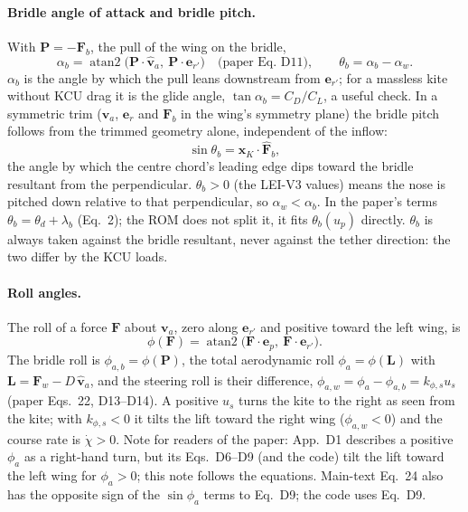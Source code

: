 \documentclass[11pt,a4paper]{article}
\begin{document}
\paragraph{Bridle angle of attack and bridle pitch.} With
$\mathbf P=-\mathbf F_b$, the pull of the wing on the bridle,
\begin{equation}
  \alpha_b=\operatorname{atan2}\bigl(\mathbf P\cdot\hat{\mathbf v}_a,\ \mathbf P\cdot\mathbf e_{r'}\bigr)
  \quad\text{(paper Eq.~D11)},\qquad
  \theta_b=\alpha_b-\alpha_w .
  \label{eq:alpha-b}
\end{equation}
$\alpha_b$ is the angle by which the pull leans downstream from
$\mathbf e_{r'}$; for a massless kite without KCU drag it is the glide angle,
$\tan\alpha_b=C_D/C_L$, a useful check. In a symmetric trim ($\mathbf v_a$,
$\mathbf e_r$ and $\mathbf F_b$ in the wing's symmetry plane) the bridle
pitch follows from the trimmed geometry alone, independent of the inflow:
\begin{equation}
  \sin\theta_b=\mathbf x_K\cdot\hat{\mathbf F}_b ,
\end{equation}
the angle by which the centre chord's leading edge dips toward the bridle
resultant from the perpendicular. $\theta_b>0$ (the LEI-V3 values) means the
nose is pitched down relative to that perpendicular, so $\alpha_w<\alpha_b$.
In the paper's terms $\theta_b=\theta_d+\lambda_b$ (Eq.~2); the ROM does not
split it, it fits $\theta_b(u_p)$ directly. $\theta_b$ is always taken
against the bridle resultant, never against the tether direction: the two
differ by the KCU loads.

\paragraph{Roll angles.} The roll of a force $\mathbf F$ about
$\mathbf v_a$, zero along $\mathbf e_{r'}$ and positive toward the left wing,
is
\begin{equation}
  \phi(\mathbf F)=\operatorname{atan2}\bigl(\mathbf F\cdot\mathbf e_p,\ \mathbf F\cdot\mathbf e_{r'}\bigr).
  \label{eq:roll}
\end{equation}
The bridle roll is $\phi_{a,b}=\phi(\mathbf P)$, the total aerodynamic roll
$\phi_a=\phi(\mathbf L)$ with $\mathbf L=\mathbf F_w-D\,\hat{\mathbf v}_a$,
and the steering roll is their difference,
$\phi_{a,w}=\phi_a-\phi_{a,b}=k_{\phi,s}u_s$ (paper Eqs.~22, D13--D14). A
positive $u_s$ turns the kite to the right as seen from the kite; with
$k_{\phi,s}<0$ it tilts the lift toward the right wing ($\phi_{a,w}<0$) and
the course rate is $\dot\chi>0$. Note for readers of the paper: App.~D1
describes a positive $\phi_a$ as a right-hand turn, but its Eqs.~D6--D9 (and
the code) tilt the lift toward the left wing for $\phi_a>0$; this note
follows the equations. Main-text Eq.~24 also has the opposite sign of the
$\sin\phi_a$ terms to Eq.~D9; the code uses Eq.~D9.
\end{document}

